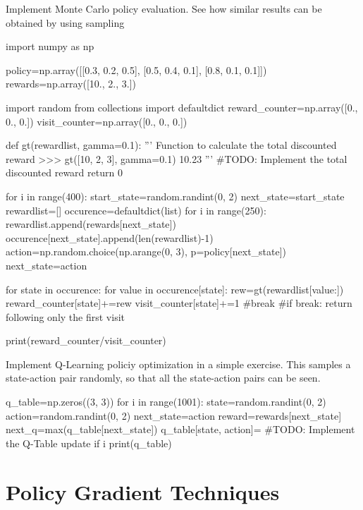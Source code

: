 \begin{exercise}
Implement Monte Carlo policy evaluation. See how similar results can be
obtained by using sampling
\begin{python}
import numpy as np

policy=np.array([[0.3, 0.2, 0.5], [0.5, 0.4, 0.1], [0.8, 0.1, 0.1]])
rewards=np.array([10., 2., 3.])

import random
from collections import defaultdict
reward_counter=np.array([0., 0., 0.])
visit_counter=np.array([0., 0., 0.])

def gt(rewardlist, gamma=0.1):
    '''
    Function to calculate the total discounted reward
    >>> gt([10, 2, 3], gamma=0.1)
    10.23
    '''
    #TODO: Implement the total discounted reward
    return 0

for i in range(400):
    start_state=random.randint(0, 2)
    next_state=start_state
    rewardlist=[]
    occurence=defaultdict(list) 
    for i in range(250):
        rewardlist.append(rewards[next_state]) 
        occurence[next_state].append(len(rewardlist)-1) 
        action=np.random.choice(np.arange(0, 3), p=policy[next_state]) 
        next_state=action

    for state in occurence: 
        for value in occurence[state]: 
            rew=gt(rewardlist[value:]) 
            reward_counter[state]+=rew 
            visit_counter[state]+=1 
            #break #if break: return following only the first visit

print(reward_counter/visit_counter)
\end{python}

\clearpage

Implement Q-Learning policiy optimization in a simple exercise. This samples a state-action pair randomly, so that all the state-action pairs can be seen.
\begin{python}
q_table=np.zeros((3, 3)) 
for i in range(1001): 
    state=random.randint(0, 2) 
    action=random.randint(0, 2) 
    next_state=action
    reward=rewards[next_state] 
    next_q=max(q_table[next_state])
    q_table[state, action]= #TODO: Implement the Q-Table update
    if i%
        print(q_table)
\end{python}
\end{exercise}


\section{Policy Gradient Techniques}

